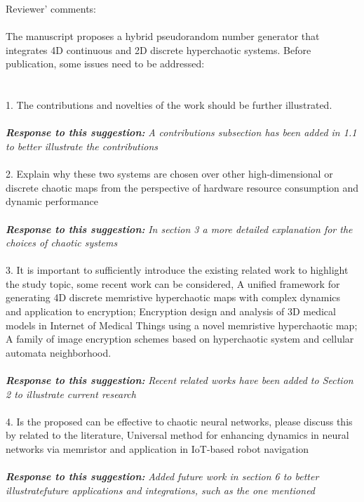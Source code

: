 \documentclass{report}
\begin{document}
Reviewer' comments:
\\
\\
The manuscript proposes a hybrid pseudorandom number generator that integrates 4D
continuous and 2D discrete hyperchaotic systems. Before publication, some issues need
to be addressed: \\
\\
\\
1. The contributions and novelties of the work should be further
illustrated.
\\
\\
\textbf{\textit{Response to this suggestion:}}
\textit{A contributions subsection has been added in 1.1 to better illustrate the contributions}
\\
\\
2.  Explain why these two systems are chosen over other high-dimensional or
discrete chaotic maps from the perspective of hardware resource consumption and
dynamic performance
\\
\\
\textbf{\textit{Response to this suggestion:}}
\textit{In section 3 a more detailed explanation for the choices of chaotic systems}
\\
\\
3. It is important to sufficiently introduce the existing related work
to highlight the study topic, some recent work can be considered, A unified framework
for generating 4D discrete memristive hyperchaotic maps with complex dynamics and
application to encryption; Encryption design and analysis of 3D medical models in
Internet of Medical Things using a novel memristive hyperchaotic map; A family of
image encryption schemes based on hyperchaotic system and cellular automata
neighborhood.
\\
\\
\textbf{\textit{Response to this suggestion:}}
\textit{Recent related works have been added to Section 2 to illustrate current research}
\\
\\
4. Is the proposed can be effective to chaotic neural networks, please
discuss this by related to the literature, Universal method for enhancing dynamics in
neural networks via memristor and application in IoT-based robot navigation
\\
\\
\textbf{\textit{Response to this suggestion:}}
\textit{Added future work in section 6 to better illustratefuture applications and integrations, such as the one mentioned}
\\
\end{document}
